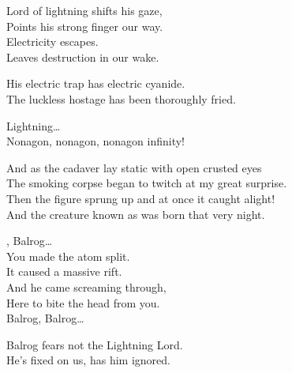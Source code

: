 
Lord of lightning shifts his gaze, \\
Points his strong finger our way. \\
Electricity escapes. \\
Leaves destruction in our wake. \\


His electric trap has electric cyanide. \\
The luckless hostage has been thoroughly fried. \\


Lightning… \\

Nonagon, nonagon, nonagon infinity! \\


And as the cadaver lay static with open crusted eyes \\
The smoking corpse began to twitch at my great surprise. \\

Then the figure sprung up and at once it caught alight! \\
And the creature known as  was born that very night. \\





, Balrog… \\

You made the atom split. \\
It caused a massive rift. \\
And he came screaming through, \\
Here to bite the head from you. \\

Balrog, Balrog… \\


Balrog fears not the Lightning Lord. \\
He's fixed on us, has him ignored. \\

